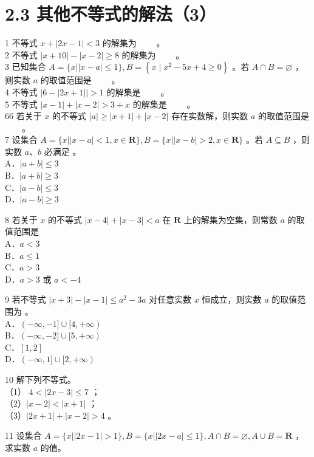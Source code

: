 \documentclass[10pt]{article}
\begin{document}
\section*{2.3 其他不等式的解法（3）}
1 不等式 \(x+|2 x-1|<3\) 的解集为 \(\qquad\)。\\
2 不等式 \(|x+10|-|x-2| \geqslant 8\) 的解集为 \(\qquad\)。\\
3 已知集合 \(A=\{x| | x-a \mid \leqslant 1\}, B=\left\{x \mid x^{2}-5 x+4 \geqslant 0\right\}\) 。若 \(A \cap B=\varnothing\) ，则实数 \(a\) 的取值范围是 \(\qquad\)。\\
4 不等式 \(|6-|2 x+1||>1\) 的解集是 \(\qquad\)。\\
5 不等式 \(|x-1|+|x-2|>3+x\) 的解集是 \(\qquad\)。\\
66 若关于 \(x\) 的不等式 \(|a| \geqslant|x+1|+|x-2|\) 存在实数解，则实数 \(a\) 的取值范围是 \(\qquad\)。\\
7 设集合 \(A=\{x| | x-a \mid<1, x \in \mathbf{R}\}, B=\{x| | x-b \mid>2, x \in \mathbf{R}\}\) 。若 \(A \subseteq B\) ，则实数 \(a 、 b\) 必满足 。\\
A．\(|a+b| \leqslant 3\)\\
B．\(|a+b| \geqslant 3\)\\
C．\(|a-b| \leqslant 3\)\\
D．\(|a-b| \geqslant 3\)

8 若关于 \(x\) 的不等式 \(|x-4|+|x-3|<a\) 在 \(\mathbf{R}\) 上的解集为空集，则常数 \(a\) 的取值范围是\\
A．\(a<3\)\\
B．\(a \leqslant 1\)\\
C．\(a>3\)\\
D．\(a>3\) 或 \(a<-4\)

9 若不等式 \(|x+3|-|x-1| \leqslant a^{2}-3 a\) 对任意实数 \(x\) 恒成立，则实数 \(a\) 的取值范围为 。\\
A．\((-\infty,-1] \cup[4,+\infty)\)\\
B．\((-\infty,-2] \cup[5,+\infty)\)\\
C．\([1,2]\)\\
D．\((-\infty, 1] \cup[2,+\infty)\)

10 解下列不等式。\\
（1） \(4<|2 x-3| \leqslant 7\) ；\\
（2）\(|x-2|<|x+1|\) ；\\
（3）\(|2 x+1|+|x-2|>4\) 。

11 设集合 \(A=\{x| | 2 x-1 \mid>1\}, B=\{x| | 2 x-a \mid \leqslant 1\}, A \cap B=\varnothing, A \cup B=\mathbf{R}\) ，求实数 \(a\) 的值。
\end{document}
